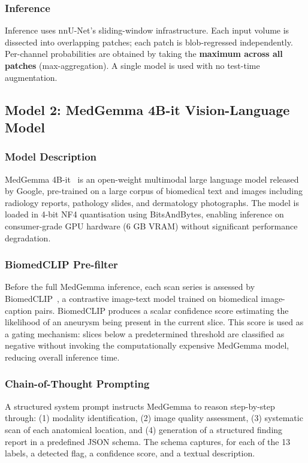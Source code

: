 \documentclass[journal]{IEEEtran}
\begin{document}
\subsubsection{Inference}
Inference uses nnU-Net's sliding-window infrastructure. Each input volume
is dissected into overlapping patches; each patch is blob-regressed
independently. Per-channel probabilities are obtained by taking the
\textbf{maximum across all patches} (max-aggregation). A single model
is used with no test-time augmentation.

\subsection{Model 2: MedGemma 4B-it Vision-Language Model}

\subsubsection{Model Description}
MedGemma 4B-it~\cite{medgemma2024} is an open-weight multimodal large language
model released by Google, pre-trained on a large corpus of biomedical text and
images including radiology reports, pathology slides, and dermatology photographs.
The model is loaded in 4-bit NF4 quantisation using BitsAndBytes, enabling
inference on consumer-grade GPU hardware (6 GB VRAM) without significant
performance degradation.

\subsubsection{BiomedCLIP Pre-filter}
Before the full MedGemma inference, each scan series is assessed by
BiomedCLIP~\cite{biomedclip2023}, a contrastive image-text model trained on
biomedical image-caption pairs. BiomedCLIP produces a scalar confidence score
estimating the likelihood of an aneurysm being present in the current slice.
This score is used as a gating mechanism: slices below a predetermined threshold
are classified as negative without invoking the computationally expensive
MedGemma model, reducing overall inference time.

\subsubsection{Chain-of-Thought Prompting}
A structured system prompt instructs MedGemma to reason step-by-step through:
(1) modality identification, (2) image quality assessment, (3) systematic scan
of each anatomical location, and (4) generation of a structured finding report
in a predefined JSON schema. The schema captures, for each of the 13 labels,
a detected flag, a confidence score, and a textual description.
\end{document}
